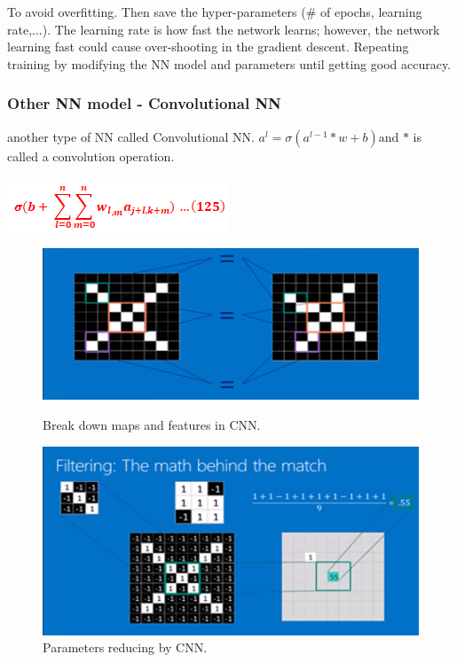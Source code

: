 \documentclass{article}
\begin{document}
To avoid overfitting. Then save the hyper-parameters (\# of epochs, learning rate,...). The learning rate is how fast the network learns; however, the network learning fast could cause over-shooting in the gradient descent.
Repeating training by modifying the NN model and parameters until getting good accuracy.

\subsubsection{Other NN model - Convolutional NN}
another type of NN called Convolutional NN. $a^l=\sigma{(a^{l-1}*w+b)}$and $\ast$ is called a convolution operation.

\includegraphics[scale=0.8]{img/con_eqn.png}

\begin{figure}[H]
  \centering
  \begin{minipage}[b]{0.6\textwidth}
    \includegraphics[width=\textwidth]{img/convol.png}
    \caption{Break down maps and features in CNN.\protect\cite{CON}}
    \label{over}
  \end{minipage}
  \hfill
  \begin{minipage}[b]{0.6\textwidth}
    \includegraphics[width=\textwidth]{img/convol1.png}
    \caption{Parameters reducing by CNN.\protect\cite{CON}}
    \label{over1}
  \end{minipage}
\end{figure}
\end{document}
